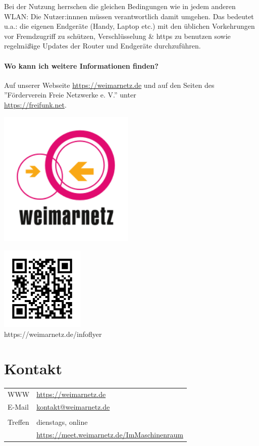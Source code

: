 \documentclass[10pt,a4paper,notumble]{leaflet}
\begin{document}
Bei der Nutzung herrschen die gleichen Bedingungen wie in jedem anderen WLAN: Die Nutzer:innnen müssen verantwortlich damit umgehen. Das bedeutet u.a.: die eigenen Endgeräte (Handy, Laptop etc.) mit den üblichen Vorkehrungen vor Fremdzugriff zu schützen, Verschlüsselung \& https zu benutzen sowie regelmäßige Updates der Router und Endgeräte durchzuführen.

\paragraph{Wo kann ich weitere Informationen finden?}
Auf unserer Webseite \href{https://weimarnetz.de}{https://weimarnetz.de} und auf den Seiten des ''Förderverein Freie Netzwerke e. V.'' unter \\\href{https://freifunk.net}{https://freifunk.net}.

\newpage
\begin{center}
\includegraphics[width=65mm]{weimarnetz_logo.png}
\end{center}
\vspace{3em}
\begin{center}
\includegraphics[width=40mm]{qr.png}\\
\footnotesize https://weimarnetz.de/infoflyer
\end{center}
\vfill
\section{Kontakt}
\begin{tabular}{ll}
WWW & \href{https://weimarnetz.de}{https://weimarnetz.de}\\
E-Mail & \href{mailto:kontakt@weimarnetz.de}{kontakt@weimarnetz.de}\\
        \\
Treffen & dienstags, online\\
	& \href{https://meet.weimarnetz.de/ImMaschinenraum}{\small https://meet.weimarnetz.de/ImMaschinenraum}
\end{tabular}
\end{document}
